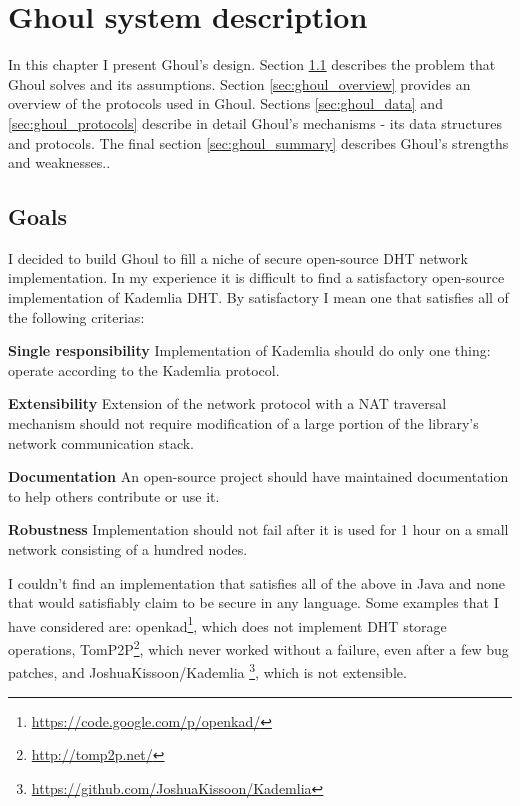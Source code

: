 \chapter{Ghoul system description}

In this chapter I present Ghoul's design. Section \ref{sec:ghoul_goals}
describes the problem that Ghoul solves and its assumptions. Section
\ref{sec:ghoul_overview} provides an overview of the protocols used in Ghoul.
Sections \ref{sec:ghoul_data} and \ref{sec:ghoul_protocols} describe in detail
Ghoul's mechanisms - its data structures and protocols. The final section
\ref{sec:ghoul_summary} describes Ghoul's strengths and weaknesses..

\section{Goals}
\label{sec:ghoul_goals}
I decided to build Ghoul to fill a niche of secure open-source DHT network
implementation. In my experience it is difficult to find a satisfactory
open-source implementation of Kademlia DHT. By satisfactory I mean one that
satisfies all of the following criterias:

\begin{description}
  \item{\textbf{Single responsibility}} Implementation of Kademlia should do
    only one thing: operate according to the Kademlia protocol.
  \item{\textbf{Extensibility}} Extension of the network protocol with a
    NAT traversal mechanism should not require modification of a large portion
    of the library's network communication stack.
  \item{\textbf{Documentation}} An open-source project should have maintained
    documentation to help others contribute or use it.
  \item{\textbf{Robustness}} Implementation should not fail after it is used
    for 1 hour on a small network consisting of a hundred nodes.
\end{description}

I couldn't find an implementation that satisfies all of the above in Java and
none that would satisfiably claim to be secure in any language. Some examples
that I have considered are:
openkad\footnote{\url{https://code.google.com/p/openkad/}}, which does not
implement DHT storage operations, TomP2P\footnote{\url{http://tomp2p.net/}},
which never worked without a failure, even after a few bug patches, and
JoshuaKissoon/Kademlia
\footnote{\url{https://github.com/JoshuaKissoon/Kademlia}}, which is not
extensible.

